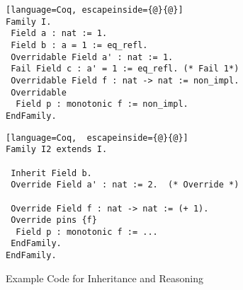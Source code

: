 \begin{figure}[!htb]
  \begin{minipage}[t]{0.47\linewidth}
\begin{lstlisting}[language=Coq, escapeinside={@}{@}]
Family I.
 Field a : nat := 1.
 Field b : a = 1 := eq_refl.
 Overridable Field a' : nat := 1.
 Fail Field c : a' = 1 := eq_refl. (* Fail 1*)
 Overridable Field f : nat -> nat := non_impl.
 Overridable 
  Field p : monotonic f := non_impl.
EndFamily.
\end{lstlisting}
  \end{minipage}
\begin{minipage}[t]{0.45\linewidth}
\begin{lstlisting}[language=Coq,  escapeinside={@}{@}]
Family I2 extends I.
 
 Inherit Field b.
 Override Field a' : nat := 2.  (* Override *)

 Override Field f : nat -> nat := (+ 1).
 Override pins {f} 
  Field p : monotonic f := ...
 EndFamily. 
EndFamily.
\end{lstlisting}
  \end{minipage}
  \caption{Example Code for Inheritance and Reasoning}\label{fig:plugin-example3}
\end{figure}






